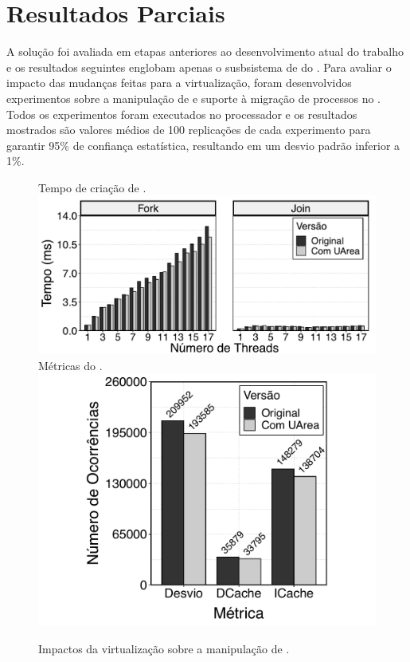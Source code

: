 
\chapter{Resultados Parciais}
\label{chap.results}

A solução foi avaliada em etapas anteriores ao desenvolvimento atual do trabalho e os resultados seguintes englobam apenas o susbsistema de \threads do \nanvix. 
%
Para avaliar o impacto das mudanças feitas para a virtualização, foram desenvolvidos experimentos sobre a manipulação de \threads e suporte à migração de processos no \nanvix. Todos os experimentos foram executados no processador \mppa e os resultados mostrados são valores médios de 100 replicações de cada experimento para garantir 95\% de confiança estatística, resultando em um desvio padrão inferior a 1\%.

\begin{figure}[b]
	\centering
                   {Tempo de criação de \threads.}
                   {\includegraphics[width=\textwidth]{content/images/fork-join-kernel-time-bars.pdf}}
	\qquad
                   {Métricas do .}
                   {\includegraphics[width=\textwidth]{content/images/fork-join-kernel-counters.pdf}}
	\caption{Impactos da virtualização sobre a manipulação de \threads.\label{fig.threads}}%
\end{figure}

